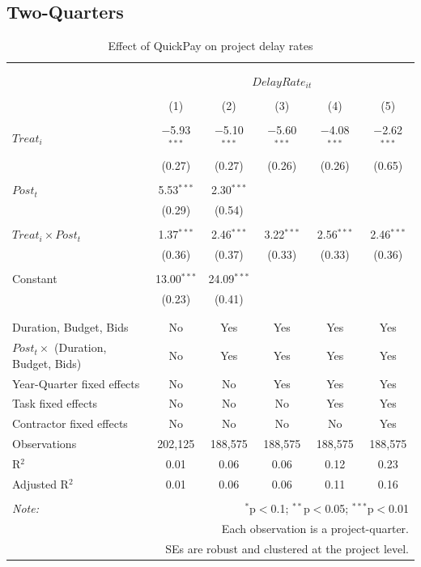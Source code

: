 \documentclass[
]{article}
\begin{document}
\hypertarget{two-quarters}{%
\subsection{Two-Quarters}\label{two-quarters}}

\begin{table}[H] \centering 
  \caption{Effect of QuickPay on project delay rates} 
  \label{} 
\small 
\begin{tabular}{@{\extracolsep{-2pt}}lccccc} 
\\[-1.8ex]\hline 
\hline \\[-1.8ex] 
\\[-1.8ex] & \multicolumn{5}{c}{$DelayRate_{it}$} \\ 
\\[-1.8ex] & (1) & (2) & (3) & (4) & (5)\\ 
\hline \\[-1.8ex] 
 $Treat_i$ & $-$5.93$^{***}$ & $-$5.10$^{***}$ & $-$5.60$^{***}$ & $-$4.08$^{***}$ & $-$2.62$^{***}$ \\ 
  & (0.27) & (0.27) & (0.26) & (0.26) & (0.65) \\ 
  & & & & & \\ 
 $Post_t$ & 5.53$^{***}$ & 2.30$^{***}$ &  &  &  \\ 
  & (0.29) & (0.54) &  &  &  \\ 
  & & & & & \\ 
 $Treat_i \times Post_t$ & 1.37$^{***}$ & 2.46$^{***}$ & 3.22$^{***}$ & 2.56$^{***}$ & 2.46$^{***}$ \\ 
  & (0.36) & (0.37) & (0.33) & (0.33) & (0.36) \\ 
  & & & & & \\ 
 Constant & 13.00$^{***}$ & 24.09$^{***}$ &  &  &  \\ 
  & (0.23) & (0.41) &  &  &  \\ 
  & & & & & \\ 
\hline \\[-1.8ex] 
Duration, Budget, Bids & No & Yes & Yes & Yes & Yes \\ 
$Post_t \times$  (Duration, Budget, Bids) & No & Yes & Yes & Yes & Yes \\ 
Year-Quarter fixed effects & No & No & Yes & Yes & Yes \\ 
Task fixed effects & No & No & No & Yes & Yes \\ 
Contractor fixed effects & No & No & No & No & Yes \\ 
Observations & 202,125 & 188,575 & 188,575 & 188,575 & 188,575 \\ 
R$^{2}$ & 0.01 & 0.06 & 0.06 & 0.12 & 0.23 \\ 
Adjusted R$^{2}$ & 0.01 & 0.06 & 0.06 & 0.11 & 0.16 \\ 
\hline 
\hline \\[-1.8ex] 
\textit{Note:}  & \multicolumn{5}{r}{$^{*}$p$<$0.1; $^{**}$p$<$0.05; $^{***}$p$<$0.01} \\ 
 & \multicolumn{5}{r}{Each observation is a project-quarter.} \\ 
 & \multicolumn{5}{r}{SEs are robust and clustered at the project level.} \\ 
\end{tabular} 
\end{table}
\end{document}
